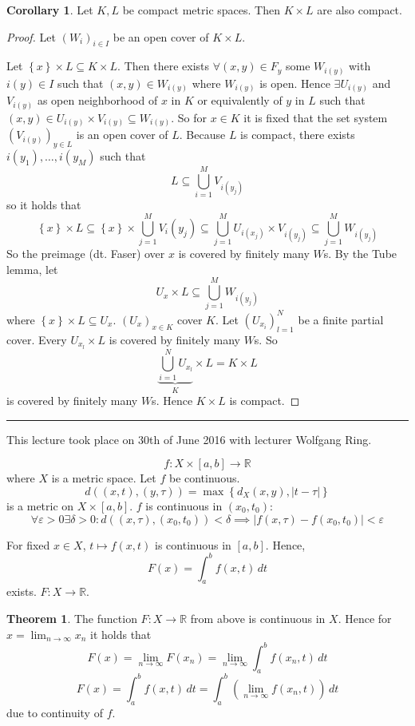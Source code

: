 \documentclass[a4paper,landscape,twocolumn]{article}
\theoremstyle{definition}
\newtheorem{theorem}{Theorem}
\newtheorem{cor}{Corollary}
\newcommand\set[1]{\left\{#1\right\}}
\newcommand\abs[1]{\left|#1\right|}
\newcommand\meta[3]{\hrule{} This #1 took place on #2 with lecturer #3.\par}
\begin{document}
\begin{cor}
  Let $K, L$ be compact metric spaces. Then $K \times L$ are also compact.
\end{cor}
\begin{proof}
  Let $(W_i)_{i \in I}$ be an open cover of $K \times L$.

  Let $\set{x} \times L \subseteq K \times L$.
  Then there exists $\forall (x,y) \in F_y$ some $W_{i(y)}$ with $i(y) \in I$
  such that $(x,y) \in W_{i(y)}$ where $W_{i(y)}$ is open. Hence $\exists U_{i(y)}$
  and $V_{i(y)}$ as open neighborhood of $x$ in $K$ or equivalently
  of $y$ in $L$ such that $(x,y) \in U_{i(y)} \times V_{i(y)} \subseteq W_{i(y)}$.
  So for $x \in K$ it is fixed that the set system $(V_{i(y)})_{y \in L}$ is an open
  cover of $L$. Because $L$ is compact, there exists $i(y_1), \ldots, i(y_M)$ such that
  \[ L \subseteq \bigcup_{i=1}^M V_{i(y_j)} \]
  so it holds that
  \[ \set{x} \times L \subseteq \set{x} \times \bigcup_{j=1}^M V_i(y_j) \subseteq \bigcup_{j=1}^M U_{i(x_j)} \times V_{i(y_j)} \subseteq \bigcup_{j=1}^M W_{i(y_j)} \]
  So the preimage (dt. Faser) over $x$ is covered by finitely many $W$s.
  By the Tube lemma, let
  \[ U_x \times L \subseteq \bigcup_{j=1}^M W_{i(y_j)} \]
  where $\set{x} \times L \subseteq U_x$.
  $(U_x)_{x \in K}$ cover $K$. Let $(U_{x_i})_{l=1}^N$ be a finite partial cover.
  Every $U_{x_l} \times L$ is covered by finitely many $W$s. So
  \[ \underbrace{\bigcup_{i=1}^N U_{x_l}}_{K} \times L = K \times L \]
  is covered by finitely many $W$s.
  Hence $K \times L$ is compact.
\end{proof}

\meta{lecture}{30th of June 2016}{Wolfgang Ring}

\[ f: X \times [a,b] \to \mathbb R \]
where $X$ is a metric space. Let $f$ be continuous.
\[ d((x,t), (y,\tau)) = \max\set{d_X(x,y), \abs{t - \tau}} \]
is a metric on $X \times [a,b]$.
$f$ is continuous in $(x_0, t_0)$:
\[
  \forall \varepsilon > 0 \exists \delta > 0:
  d((x, \tau), (x_0, t_0)) < \delta \implies
  \abs{f(x, \tau) - f(x_0, t_0)} < \varepsilon
\]

For fixed $x \in X$, $t \mapsto f(x, t)$ is continuous in $[a,b]$. Hence,
\[ F(x) = \int_a^b f(x,t) \, dt \]
exists. $F: X \to \mathbb R$.

\begin{theorem}
  The function $F: X \to \mathbb R$ from above is continuous in $X$.
  Hence for $x = \lim_{n\to\infty} x_n$ it holds that
  \[ F(x) = \lim_{n\to\infty} F(x_n) = \lim_{n\to\infty} \int_a^b f(x_n,t) \, dt \]
  \[ F(x) = \int_a^b f(x,t) \, dt = \int_a^b \left(\lim_{n\to\infty} f(x_n, t)\right) \, dt \]
  due to continuity of $f$.
\end{theorem}
\end{document}

